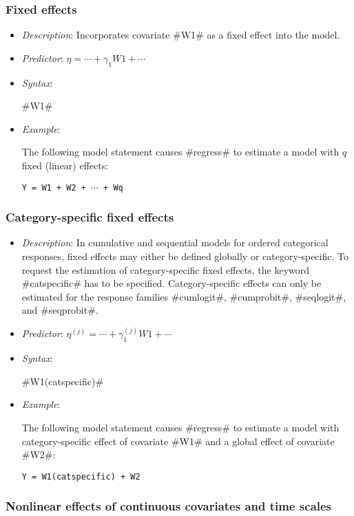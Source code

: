 \subsubsection*{Fixed effects}

\begin{itemize}
\item[] {\em Description}: Incorporates covariate #W1# as a fixed effect into the model.
\item[] {\em Predictor}: $\eta =  \cdots + \gamma_1 W1 + \cdots$
\item[] {\em Syntax}:

#W1#
\item[] {\em Example}:

The following model statement causes #regress# to estimate a model
with $q$ fixed (linear) effects:

\texttt{Y = W1 + W2 + $\cdots$ + Wq}
\end{itemize}

\subsubsection*{Category-specific fixed effects}

\begin{itemize}
\item[] {\em Description}: In cumulative and sequential models for
ordered categorical responses, fixed effects may either be defined
globally or category-specific. To request the estimation of
category-specific fixed effects, the keyword #catspecific# has to
be specified. Category-specific effects can only be estimated for
the response families #cumlogit#, #cumprobit#, #seqlogit#, and
#seqprobit#.
\item[] {\em Predictor}: $\eta^{(j)} =  \cdots +
\gamma_1^{(j)} W1 + \cdots$ \item[] {\em Syntax}:

#W1(catspecific)#
\item[] {\em Example}:

The following model statement causes #regress# to estimate a model
with category-specific effect of covariate #W1# and a global
effect of covariate #W2#:

\texttt{Y = W1(catspecific) + W2}
\end{itemize}

\subsubsection*{Nonlinear effects of continuous covariates and time
scales}

